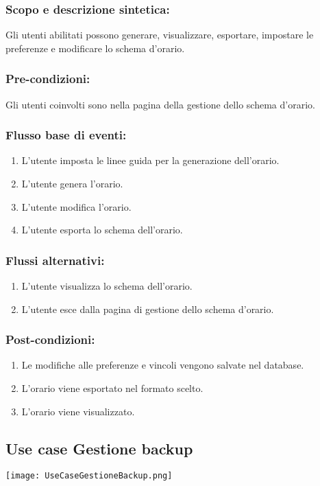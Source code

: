 \documentclass[11pt,a4paper]{article}
\begin{document}
\subsubsection*{Scopo e descrizione sintetica:}
Gli utenti abilitati possono generare, visualizzare, esportare, impostare le preferenze e modificare lo schema d'orario.
\subsubsection*{Pre-condizioni:}
Gli utenti coinvolti sono nella pagina della gestione dello schema d'orario.
\subsubsection*{Flusso base di eventi:}
\begin{enumerate}
 \item L'utente imposta le linee guida per la generazione dell'orario.
 \item L'utente genera l'orario. 
 \item L'utente modifica l'orario.
 \item L'utente esporta lo schema dell'orario.
\end{enumerate}
\subsubsection*{Flussi alternativi:}
\begin{enumerate}
 \item L'utente visualizza lo schema dell'orario.
 \item L'utente esce dalla pagina di gestione dello schema d'orario.
\end{enumerate}
\subsubsection*{Post-condizioni:}
\begin{enumerate}
 \item Le modifiche alle preferenze e vincoli vengono salvate nel database.
 \item L'orario viene esportato nel formato scelto.
 \item L'orario viene visualizzato.
\end{enumerate}  
\subsection{Use case Gestione backup}
\begin{center} 
 \texttt{[image: UseCaseGestioneBackup.png]}
\end{center}
\end{document}
